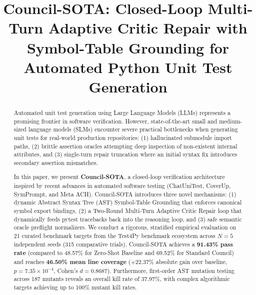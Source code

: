 \documentclass[conference]{IEEEtran}
\begin{document}
\title{Council-SOTA: Closed-Loop Multi-Turn Adaptive Critic Repair with Symbol-Table Grounding for Automated Python Unit Test Generation}

\author{
}

\maketitle

\begin{abstract}
Automated unit test generation using Large Language Models (LLMs) represents a promising frontier in software verification. However, state-of-the-art small and medium-sized language models (SLMs) encounter severe practical bottlenecks when generating unit tests for real-world production repositories: (1) hallucinated submodule import paths, (2) brittle assertion oracles attempting deep inspection of non-existent internal attributes, and (3) single-turn repair truncation where an initial syntax fix introduces secondary assertion mismatches. 

In this paper, we present \textbf{Council-SOTA}, a closed-loop verification architecture inspired by recent advances in automated software testing (ChatUniTest, CoverUp, SymPrompt, and Meta ACH). Council-SOTA introduces three novel mechanisms: (1) dynamic Abstract Syntax Tree (AST) Symbol-Table Grounding that enforces canonical symbol export bindings, (2) a Two-Round Multi-Turn Adaptive Critic Repair loop that dynamically feeds pytest tracebacks back into the reasoning loop, and (3) safe semantic oracle preflight normalizers. We conduct a rigorous, stratified empirical evaluation on 21 curated benchmark targets from the Test4Py benchmark ecosystem across $N=5$ independent seeds (315 comparative trials). Council-SOTA achieves a \textbf{91.43\% pass rate} (compared to 48.57\% for Zero-Shot Baseline and 69.52\% for Standard Council) and reaches \textbf{46.50\% mean line coverage} ($+22.37\%$ absolute gain over baseline, $p = 7.35 \times 10^{-4}$, Cohen's $d = 0.8687$). Furthermore, first-order AST mutation testing across 187 mutants reveals an overall kill rate of 37.97\%, with complex algorithmic targets achieving up to 100\% mutant kill rates.
\end{abstract}
\end{document}
